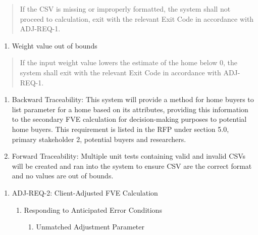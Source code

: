 \documentclass[
]{article}
\begin{document}
\begin{quote}
If the CSV is missing or improperly formatted, the system shall not
proceed to calculation, \hl{}exit with the relevant Exit Code in
accordance with ADJ-REQ-1.
\end{quote}

\begin{enumerate}
\def\labelenumi{\roman{enumi}.}
\setcounter{enumi}{1}
\item
  Weight value out of bounds
\end{enumerate}

\begin{quote}
If the input weight value lowers the estimate of the home below 0, the
system shall exit with the relevant Exit Code in accordance with
ADJ-REQ-1.
\end{quote}

\begin{enumerate}
\def\labelenumi{\alph{enumi}.}
\setcounter{enumi}{1}
\item
  Backward Traceability: This system will provide a method for home
  buyers to list parameter for a home based on its attributes, providing
  this information to the secondary FVE calculation for decision-making
  purposes to potential home buyers. This requirement is listed in the
  RFP under section 5.0, primary stakeholder 2, potential buyers and
  researchers.
\item
  Forward Traceability: Multiple unit tests containing valid and invalid
  CSVs will be created and ran into the system to ensure CSV are the
  correct format and no values are out of bounds.
\end{enumerate}

\begin{enumerate}
\def\labelenumi{\Roman{enumi})}
\setcounter{enumi}{1}
\item
  ADJ-REQ-2: Client-Adjusted FVE Calculation

  \begin{enumerate}
  \def\labelenumii{\alph{enumii}.}
  \item
    Responding to Anticipated Error Conditions

    \begin{enumerate}
    \def\labelenumiii{\roman{enumiii}.}
    \item
      Unmatched Adjustment Parameter
    \end{enumerate}
  \end{enumerate}
\end{enumerate}
\end{document}
